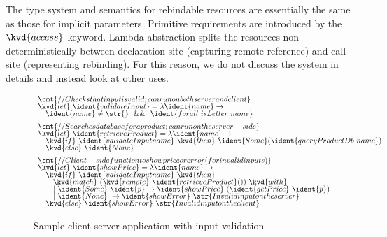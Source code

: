 The type system and semantics for rebindable resources are essentially the same as those for
implicit parameters. Primitive requirements are introduced by the $\kvd{access}$ keyword. 
Lambda abstraction splits the resources non-deterministically between declaration-site 
(capturing remote reference) and call-site (representing rebinding). For this reason, we do not
discuss the system in details and instead look at other uses.


\begin{figure}
\begin{equation*}
\begin{array}{l}
\cmt{// Checks that input is valid; can run on both server and client}\\[-0.25em]
\kvd{let}~\ident{validateInput} = \lambda \ident{name} \rightarrow\\[-0.25em]
\quad\ident{name} \neq \str{} ~~\&\&~~ \ident{forall~isLetter~name}
\\[0.5em]
\cmt{// Searches database for a product; can run on the server-side}\\[-0.25em]
\kvd{let}~\ident{retrieveProduct} = \lambda \ident{name} \rightarrow\\[-0.25em]
\quad\kvd{if}~\ident{validateInput name}~\kvd{then}~\ident{Some}(\ident{queryProductDb~name})\\[-0.25em]
\quad\kvd{else}~\ident{None}
\\[0.5em]
\cmt{// Client-side function to show price or error (for invalid inputs)}\\[-0.25em]
\kvd{let}~\ident{showPrice} = \lambda \ident{name} \rightarrow\\[-0.25em]
\quad\kvd{if}~\ident{validateInput name}~\kvd{then}\\[-0.25em]
\quad\quad\kvd{match}~(\kvd{remote}~\ident{retrieveProduct}())~\kvd{with}\\[-0.25em]
\quad\quad|~\ident{Some}~\ident{p} \rightarrow \ident{showPrice}~(\ident{getPrice}~\ident{p})\\[-0.25em]
\quad\quad|~\ident{None}~\rightarrow \ident{showError}~\str{Invalid input on the server}\\[-0.25em]
\quad\kvd{else}~\ident{showError}~\str{Invalid input on the client}
\end{array}
\end{equation*}

\vspace{1em}
\noindent\makebox[\linewidth]{\rule{\textwidth}{0.5pt}} 
\vspace{-1.5em}
\caption{Sample client-server application with input validation}
\label{fig:applications-flat-distr}
\end{figure}

